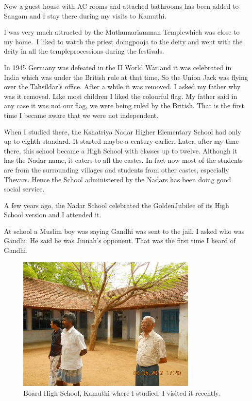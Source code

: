 Now a guest house with AC rooms and attached bathrooms has been added to 
Sangam and I stay there during my visits to Kamuthi.


I was very much attracted by the Muthumariamman Temple\break which was close 
to my home.\ I liked to watch the priest doing\break pooja to the deity and 
went with the deity in all the temple\break processions during the festivals.
  
In 1945 Germany was defeated in the II World War and it was celebrated 
in India which was under the British rule at that time. So the Union 
Jack was flying over the Tahsildar's office. After a while it was 
removed. I asked my father why was it removed. Like most children I 
liked the colourful flag. My father said in any case it was not our 
flag, we were being ruled by the British. That is the first time I 
became aware that we were not independent.

When I studied there, the Kshatriya Nadar Higher Elementary School had 
only up to eighth standard. It started maybe a century earlier. Later, 
after my time there, this school became a High School with classes up to 
twelve. Although it has the Nadar name, it caters to all the castes. 
In fact now most of the students are from the surrounding villages and 
students from other castes, especially Thevars. Hence 
the School administered by the Nadars has been doing good social 
service.

A few years ago, the Nadar School celebrated the Golden\break Jubilee of its 
High School version and I attended it.

At school a Muslim boy was saying Gandhi was sent to the jail. I asked 
who was Gandhi. He said he was Jinnah's opponent. That was the first 
time I heard of Gandhi.

\begin{figure}[H]
\centering
\includegraphics[width=0.8\textwidth]{images/new-images/04-Rajaji-school.jpg}
\caption{\small{Board High School, Kamuthi where I studied. I visited it recently.}}
\end{figure}


